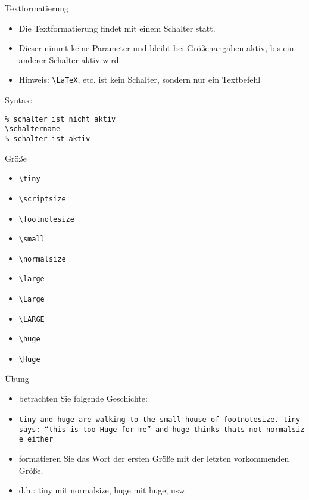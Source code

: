 \begin{frame}[fragile]{Textformatierung}

\begin{itemize}
\itemsep1pt\parskip0pt
\item
  Die Textformatierung findet mit einem Schalter statt.
\item
  Dieser nimmt keine Parameter und bleibt bei Größenangaben aktiv, bis
  ein anderer Schalter aktiv wird.
\item
  Hinweis: \texttt{\textbackslash{}LaTeX}, etc. ist kein Schalter,
  sondern nur ein Textbefehl
\end{itemize}

Syntax:

\begin{verbatim}
% schalter ist nicht aktiv
\schaltername
% schalter ist aktiv
\end{verbatim}

\end{frame}

\begin{frame}{Größe}

\begin{itemize}
\itemsep1pt\parskip0pt
\item
  \texttt{\textbackslash{}tiny}
\item
  \texttt{\textbackslash{}scriptsize}
\item
  \texttt{\textbackslash{}footnotesize}
\item
  \texttt{\textbackslash{}small}
\item
  \texttt{\textbackslash{}normalsize}
\item
  \texttt{\textbackslash{}large}
\item
  \texttt{\textbackslash{}Large}
\item
  \texttt{\textbackslash{}LARGE}
\item
  \texttt{\textbackslash{}huge}
\item
  \texttt{\textbackslash{}Huge}
\end{itemize}

\end{frame}

\begin{frame}{Übung}

\begin{itemize}
\itemsep1pt\parskip0pt
\item
  betrachten Sie folgende Geschichte:
\item
  \texttt{tiny\ and\ huge\ are\ walking\ to\ the\ small\ house\ of\ footnotesize.\ tiny\ says:\ “this\ is\ too\ Huge\ for\ me”\ and\ huge\ thinks\ thats\ not\ normalsize\ either}
\item
  formatieren Sie das Wort der ersten Größe mit der letzten vorkommenden
  Größe.
\item
  d.h.: tiny mit normalsize, huge mit huge, usw.
\end{itemize}

\end{frame}


